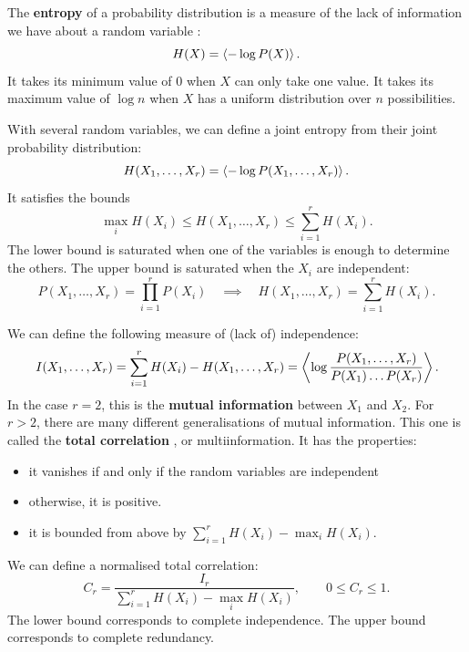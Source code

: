 \documentclass[12pt]{article}
\begin{document}
The \textbf{entropy} of a probability distribution is a measure of the lack of information we have about a random variable \cite{Cover:2006}:
%
\begin{equation}\label{eq:ent}
  H(X) = \left\langle -\log P(X) \right\rangle.
\end{equation}
%
It takes its minimum value of $0$ when $X$ can only take one value. It takes its maximum value of $\log n$ when $X$ has a uniform distribution over $n$ possibilities.

With several random variables, we can define a joint entropy from their joint probability distribution:
%
\begin{equation}\label{eq:jointent}
  H(X_1,\ldots,X_r) = \left\langle -\log P(X_1,\ldots,X_r) \right\rangle.
\end{equation}
%
It satisfies the bounds
%
\begin{equation}\label{eq:entbounds}
  \max_i H(X_i) \leq H(X_1,\ldots,X_r) \leq \sum_{i=1}^r H(X_i).
\end{equation}
%
The lower bound is saturated when one of the variables is enough to determine the others. The upper bound is saturated when the $X_i$ are independent:
%
\begin{equation}\label{eq:indent}
  P(X_1,\ldots,X_r) = \prod_{i=1}^r P(X_i)
  \quad \implies \quad
  H(X_1,\ldots,X_r) = \sum_{i=1}^r H(X_i).
\end{equation}
%

We can define the following measure of (lack of) independence:
%
\begin{equation}\label{eq:mutinf}
  I(X_1,\ldots,X_r) = \sum_{i=1}^r H(X_i) - H(X_1,\ldots,X_r) = \left\langle  \log \frac{P(X_1,\ldots,X_r)}{P(X_1)\ldots P(X_r)}  \right\rangle.
\end{equation}
%
In the case $r=2$, this is the \textbf{mutual information} between $X_1$ and $X_2$. For $r>2$, there are many different generalisations of mutual information. This one is called the \textbf{total correlation} \cite{Watanabe:1960}, or multiinformation. It has the properties:
%
\begin{itemize}
  \item it vanishes if and only if the random variables are independent
  \item otherwise, it is positive.
  \item it is bounded from above by $\sum_{i=1}^r H(X_i) - \max_i H(X_i)$.
\end{itemize}
%
We can define a normalised total correlation:
%
\begin{equation}\label{eq:normmutinfgen}
  C_r = \frac{I_r}{\sum_{i=1}^r H(X_i) - \max_i H(X_i)}, \qquad 0 \leq C_r \leq 1.
\end{equation}
%
The lower bound corresponds to complete independence. The upper bound corresponds to complete redundancy.
\end{document}
